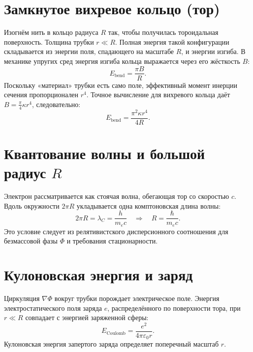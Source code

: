 \documentclass[12pt,a4paper]{article}
\begin{document}
\section{Замкнутое вихревое кольцо (тор)}

Изогнём нить в кольцо радиуса $R$ так, чтобы получилась тороидальная поверхность. Толщина трубки $r \ll R$. Полная энергия такой конфигурации складывается из энергии поля, спадающего на масштабе $R$, и энергии изгиба. В механике упругих сред энергия изгиба кольца выражается через его жёсткость $B$:
\begin{equation}
E_{\text{bend}} = \frac{\pi B}{R}.
\label{eq:bend_general}
\end{equation}
Поскольку «материал» трубки есть само поле, эффективный момент инерции сечения пропорционален $r^4$. Точное вычисление для вихревого кольца даёт $B = \frac{\pi}{4} \kappa r^4$, следовательно:
\begin{equation}
E_{\text{bend}} = \frac{\pi^2 \kappa r^4}{4R}.
\label{eq:bend_energy}
\end{equation}

\section{Квантование волны и большой радиус $R$}

Электрон рассматривается как стоячая волна, обегающая тор со скоростью $c$. Вдоль окружности $2\pi R$ укладывается одна комптоновская длина волны:
\begin{equation}
2\pi R = \lambda_C = \frac{h}{m_e c} \quad\Longrightarrow\quad R = \frac{\hbar}{m_e c}.
\label{eq:quantization}
\end{equation}
Это условие следует из релятивистского дисперсионного соотношения для безмассовой фазы $\Phi$ и требования стационарности.

\section{Кулоновская энергия и заряд}

Циркуляция $\nabla\Phi$ вокруг трубки порождает электрическое поле. Энергия электростатического поля заряда $e$, распределённого по поверхности тора, при $r \ll R$ совпадает с энергией заряженной сферы:
\begin{equation}
E_{\text{Coulomb}} = \frac{e^2}{4\pi\varepsilon_0 r}.
\label{eq:coulomb}
\end{equation}
Кулоновская энергия запертого заряда определяет поперечный масштаб $r$.
\end{document}
